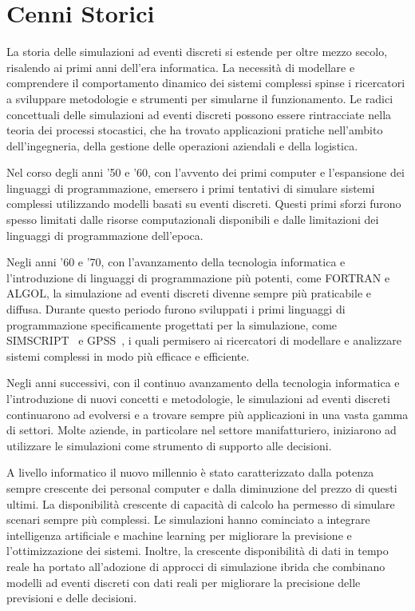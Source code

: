 \documentclass[12pt,a4paper,openright,twoside]{book}
\begin{document}
\section{Cenni Storici}
La storia delle simulazioni ad eventi discreti si estende per oltre mezzo secolo, risalendo ai primi anni dell'era informatica. La necessità di modellare e comprendere il comportamento dinamico dei sistemi complessi spinse i ricercatori a sviluppare metodologie e strumenti per simularne il funzionamento.
Le radici concettuali delle simulazioni ad eventi discreti possono essere rintracciate nella teoria dei processi stocastici, che ha trovato applicazioni pratiche nell'ambito dell'ingegneria, della gestione delle operazioni aziendali e della logistica. 

Nel corso degli anni '50 e '60, con l'avvento dei primi computer e l'espansione dei linguaggi di programmazione, emersero i primi tentativi di simulare sistemi complessi utilizzando modelli basati su eventi discreti. Questi primi sforzi furono spesso limitati dalle risorse computazionali disponibili e dalle limitazioni dei linguaggi di programmazione dell'epoca.

Negli anni '60 e '70, con l'avanzamento della tecnologia informatica e l'introduzione di linguaggi di programmazione più potenti, come FORTRAN e ALGOL, la simulazione ad eventi discreti divenne sempre più praticabile e diffusa. Durante questo periodo furono sviluppati i primi linguaggi di programmazione specificamente progettati per la simulazione, come SIMSCRIPT~\cite{DBLP:journals/ibmsj/DimsdaleM64} e GPSS~\cite{DBLP:journals/tssc/HollandM68}, i quali permisero ai ricercatori di modellare e analizzare sistemi complessi in modo più efficace e efficiente.

Negli anni successivi, con il continuo avanzamento della tecnologia informatica e l'introduzione di nuovi concetti e metodologie, le simulazioni ad eventi discreti continuarono ad evolversi e a trovare sempre più applicazioni in una vasta gamma di settori. 
Molte aziende, in particolare nel settore manifatturiero, iniziarono ad utilizzare le simulazioni come strumento di supporto alle decisioni. 

A livello informatico il nuovo millennio è stato caratterizzato dalla potenza sempre crescente dei personal computer e dalla diminuzione del prezzo di questi ultimi. La disponibilità crescente di capacità di calcolo ha permesso di simulare scenari sempre più complessi. Le simulazioni hanno cominciato a integrare intelligenza artificiale e machine learning per migliorare la previsione e l'ottimizzazione dei sistemi. Inoltre, la crescente disponibilità di dati in tempo reale ha portato all'adozione di approcci di simulazione ibrida che combinano modelli ad eventi discreti con dati reali per migliorare la precisione delle previsioni e delle decisioni.
\end{document}
